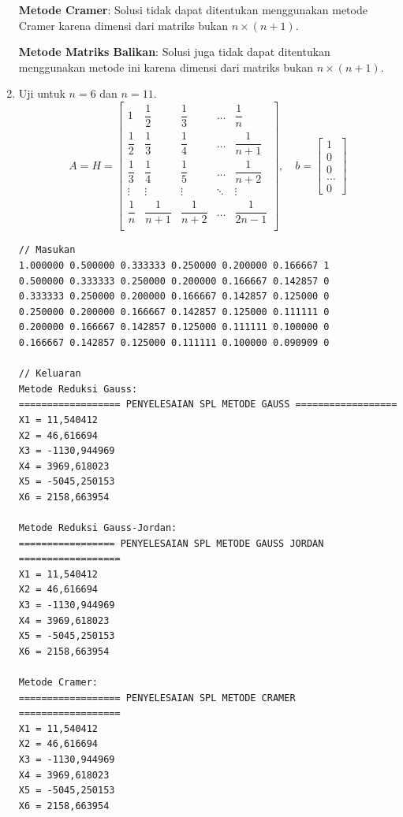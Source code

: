 \begin{enumerate}[label=(\alph*)]
\textbf{Metode Cramer}: Solusi tidak dapat ditentukan menggunakan metode Cramer karena dimensi dari matriks bukan \(n \times (n+1)\). 

\textbf{Metode Matriks Balikan}: Solusi juga tidak dapat ditentukan menggunakan metode ini karena dimensi dari matriks bukan \(n \times (n+1)\).

\pagebreak
\item Uji untuk $n = 6$ dan $n = 11$.
\[ A = H = \begin{bmatrix}
    1               & \dfrac{1}{2}   & \dfrac{1}{3}   & \ldots & \dfrac{1}{n}     \\[1em]
    \dfrac{1}{2}    & \dfrac{1}{3}   & \dfrac{1}{4}   & \ldots & \dfrac{1}{n+1}   \\[1em]
    \dfrac{1}{3}    & \dfrac{1}{4}   & \dfrac{1}{5}   & \ldots & \dfrac{1}{n+2}   \\[1em]
    \vdots          & \vdots         & \vdots         & \ddots & \vdots           \\[1em]
    \dfrac{1}{n}    & \dfrac{1}{n+1} & \dfrac{1}{n+2} & \ldots & \dfrac{1}{2n-1}\\
\end{bmatrix}, \quad b =
\begin{bmatrix}
    1 \\ 0 \\ 0 \\ \ldots \\ 0
\end{bmatrix}\]

\begin{lstlisting}[caption = spl-1d1.txt]
// Masukan
1.000000 0.500000 0.333333 0.250000 0.200000 0.166667 1
0.500000 0.333333 0.250000 0.200000 0.166667 0.142857 0
0.333333 0.250000 0.200000 0.166667 0.142857 0.125000 0
0.250000 0.200000 0.166667 0.142857 0.125000 0.111111 0
0.200000 0.166667 0.142857 0.125000 0.111111 0.100000 0
0.166667 0.142857 0.125000 0.111111 0.100000 0.090909 0

// Keluaran
Metode Reduksi Gauss:
================== PENYELESAIAN SPL METODE GAUSS ==================
X1 = 11,540412
X2 = 46,616694
X3 = -1130,944969
X4 = 3969,618023
X5 = -5045,250153
X6 = 2158,663954

Metode Reduksi Gauss-Jordan:
================= PENYELESAIAN SPL METODE GAUSS JORDAN ==================
X1 = 11,540412
X2 = 46,616694
X3 = -1130,944969
X4 = 3969,618023
X5 = -5045,250153
X6 = 2158,663954

Metode Cramer:
================== PENYELESAIAN SPL METODE CRAMER ==================
X1 = 11,540412
X2 = 46,616694
X3 = -1130,944969
X4 = 3969,618023
X5 = -5045,250153
X6 = 2158,663954


\end{lstlisting}
\end{enumerate}
